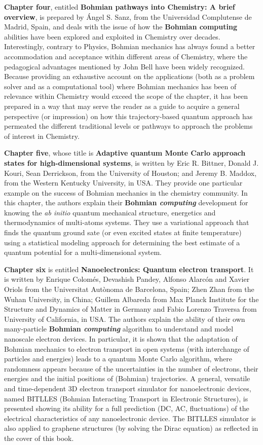 \documentclass[nofootinbib, secnumarabic, amsmath, nobibnotes,10pt,aps,pra]{revtex4-1}
\begin{document}
\textbf{Chapter four}, entitled \textbf{Bohmian pathways into Chemistry: A brief overview}, is prepared by \'Angel S. Sanz, from the Universidad Complutense de Madrid, Spain, and deals with the issue of how the \textbf{Bohmian computing} abilities have been explored and exploited in Chemistry over decades. Interestingly, contrary to Physics, Bohmian mechanics has always found a better accommodation and acceptance within different areas of Chemistry, where the pedagogical advantages mentioned by John Bell have been widely recognized.
Because providing an exhaustive account on the applications (both as a problem solver and as a computational tool) where Bohmian mechanics has been of relevance within Chemistry would exceed the scope of the chapter, it has been prepared in a way that may serve the reader as a guide to acquire a general perspective (or impression) on how this trajectory-based quantum approach has permeated the different traditional levels or pathways to approach the problems of interest in Chemistry.

\textbf{Chapter five}, whose title is \textbf{Adaptive quantum Monte Carlo approach states for high-dimensional systems}, is written by Eric R. Bittner, Donald J. Kouri, Sean Derrickson, from the University of Houston; and Jeremy B. Maddox, from the Western Kentucky University, in USA. They provide one particular example on the success of Bohmian mechanics in the chemistry community. In this chapter, the authors explain their \textbf{Bohmian \emph{computing}} development for knowing the \emph{ab initio} quantum mechanical structure, energetics and thermodynamics of multi-atoms systems. They use a variational approach that finds the quantum ground sate (or even excited states at finite temperature) using a statistical modeling approach for determining the best estimate of a quantum potential for a multi-dimensional system.

\textbf{Chapter six} is entitled \textbf{Nanoelectronics: Quantum electron transport}. It is written by Enrique Colom\'es, Devashish Pandey,  Alfonso Alarc\'on  and Xavier Oriols from the Universitat Aut\`{o}noma de Barcelona, Spain; Zhen Zhan from the Wuhan University, in China; Guillem Albareda from Max Planck Institute for the Structure and Dynamics of Matter in Germany and  Fabio Lorenzo Traversa from University of California, in USA. The authors explain the ability of their own many-particle \textbf{Bohmian \emph{computing}} algorithm to understand and model nanoscale electron devices. In particular, it is shown that the adaptation of Bohmian mechanics to electron transport in open systems (with interchange of particles and energies) leads to a quantum Monte Carlo algorithm, where randomness appears because of the uncertainties in the number of electrons, their energies and the initial positions of (Bohmian) trajectories. A general, versatile and time-dependent 3D electron transport simulator for nanoelectronic devices, named BITLLES (Bohmian Interacting Transport in Electronic Structures), is presented showing its ability for a full prediction (DC, AC, fluctuations) of the electrical characteristics of any nanoelectronic device. The BITLLES simulator is also applied to graphene structures (by solving the Dirac equation) as reflected in the cover of this book.
\end{document}

